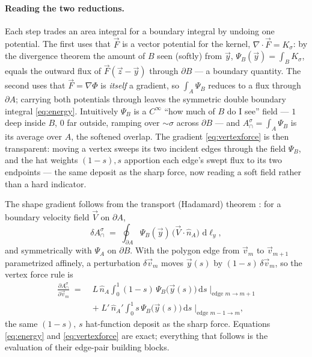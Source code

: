 \documentclass[11pt]{article}
\newcommand{\dd}{\,\mathrm{d}}
\newcommand{\nA}{\hat n_A}
\newcommand{\Acap}{A^{\sigma}_{\cap}}
\begin{document}
\paragraph{Reading the two reductions.}  Each step trades an area integral for a
boundary integral by undoing one potential.  The first uses that $\vec F$ is a vector
potential for the kernel, $\nabla\!\cdot\vec F=K_\sigma$: by the divergence theorem the
amount of $B$ seen (softly) from $\vec y$, $\Psi_B(\vec y)=\int_B K_\sigma$, equals the
outward flux of $\vec F(\vec z-\vec y)$ through $\partial B$ --- a boundary quantity.
The second uses that $\vec F=\nabla\Phi$ is \emph{itself} a gradient, so
$\int_A\Psi_B$ reduces to a flux through $\partial A$; carrying both potentials through
leaves the symmetric double boundary integral \eqref{eq:energy}.  Intuitively $\Psi_B$
is a $C^\infty$ ``how much of $B$ do I see'' field --- $1$ deep inside $B$, $0$ far
outside, ramping over $\sim\sigma$ across $\partial B$ --- and $\Acap=\int_A\Psi_B$ is
its average over $A$, the softened overlap.  The gradient \eqref{eq:vertexforce} is
then transparent: moving a vertex sweeps its two incident edges through the field
$\Psi_B$, and the hat weights $(1-s),s$ apportion each edge's swept flux to its two
endpoints --- the same deposit as the sharp force, now reading a soft field rather
than a hard indicator.

The shape gradient follows from the transport (Hadamard) theorem
\cite{DelfourZolesio2011}: for a boundary velocity field $\vec V$ on $\partial A$,
\begin{equation}
  \delta \Acap \;=\; \oint_{\partial A} \Psi_B(\vec y)\,
                      \bigl(\vec V\!\cdot\!\nA\bigr)\,\dd\ell_y ,
  \label{eq:shape}
\end{equation}
and symmetrically with $\Psi_A$ on $\partial B$.  With the polygon edge from
$\vec v_m$ to $\vec v_{m+1}$ parametrized affinely, a perturbation
$\delta\vec v_m$ moves $\vec y(s)$ by $(1-s)\,\delta\vec v_m$, so the vertex force
rule is
\begin{equation}
\begin{aligned}
  \frac{\partial \Acap}{\partial \vec v_m}
  \;=\;& L\,\nA \int_0^1 (1-s)\,\Psi_B\bigl(\vec y(s)\bigr)\dd s
  \;\Big|_{\text{edge } m\to m+1}\\
  &+\; L'\,\nA' \int_0^1 s\,\Psi_B\bigl(\vec y(s)\bigr)\dd s
  \;\Big|_{\text{edge } m-1\to m},
\end{aligned}
  \label{eq:vertexforce}
\end{equation}
the same $(1-s),\,s$ hat-function deposit as the sharp force.  Equations
\eqref{eq:energy} and \eqref{eq:vertexforce} are exact; everything that follows is
the evaluation of their edge-pair building blocks.
\end{document}

